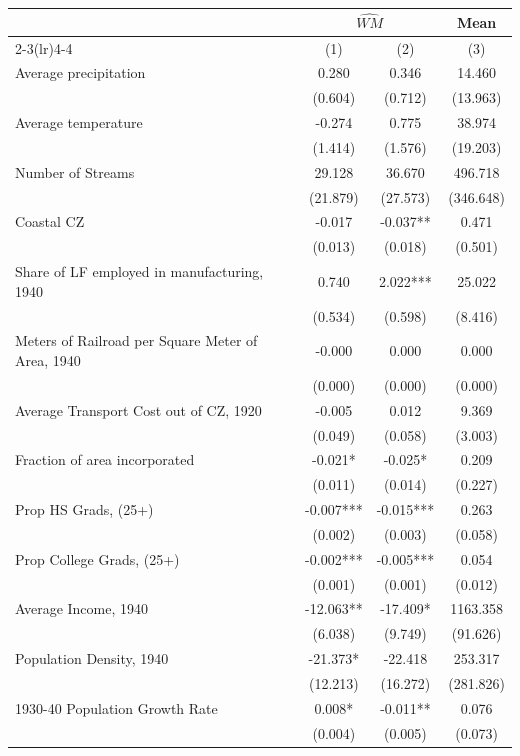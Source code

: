 \begin{tabular}{l*{3}{c}} \toprule
&\multicolumn{2}{c}{$\widehat{WM}$}&\multicolumn{1}{c}{Mean}\\\cmidrule(lr){2-3}\cmidrule(lr){4-4}
&\multicolumn{1}{c}{(1)}&\multicolumn{1}{c}{(2)}&\multicolumn{1}{c}{(3)}\\
\midrule 
Average precipitation  &    0.280 & 0.346 & 14.460 \\
                &  (0.604)  &  (0.712)  &  (13.963)    \\
Average temperature  &    -0.274 & 0.775 & 38.974 \\
                &  (1.414)  &  (1.576)  &  (19.203)    \\
Number of Streams  &    29.128 & 36.670 & 496.718 \\
                &  (21.879)  &  (27.573)  &  (346.648)    \\
Coastal CZ  &    -0.017 & -0.037** & 0.471 \\
                &  (0.013)  &  (0.018)  &  (0.501)    \\
Share of LF employed in manufacturing, 1940  &    0.740 & 2.022*** & 25.022 \\
                &  (0.534)  &  (0.598)  &  (8.416)    \\
Meters of Railroad per Square Meter of Area, 1940  &    -0.000 & 0.000 & 0.000 \\
                &  (0.000)  &  (0.000)  &  (0.000)    \\
Average Transport Cost out of CZ, 1920  &    -0.005 & 0.012 & 9.369 \\
                &  (0.049)  &  (0.058)  &  (3.003)    \\
Fraction of area incorporated  &    -0.021* & -0.025* & 0.209 \\
                &  (0.011)  &  (0.014)  &  (0.227)    \\
Prop HS Grads, (25+)  &    -0.007*** & -0.015*** & 0.263 \\
                &  (0.002)  &  (0.003)  &  (0.058)    \\
Prop College Grads, (25+)  &    -0.002*** & -0.005*** & 0.054 \\
                &  (0.001)  &  (0.001)  &  (0.012)    \\
Average Income, 1940  &    -12.063** & -17.409* & 1163.358 \\
                &  (6.038)  &  (9.749)  &  (91.626)    \\
Population Density, 1940  &    -21.373* & -22.418 & 253.317 \\
                &  (12.213)  &  (16.272)  &  (281.826)    \\
1930-40 Population Growth Rate  &    0.008* & -0.011** & 0.076 \\
                &  (0.004)  &  (0.005)  &  (0.073)    \\
\bottomrule \end{tabular}
